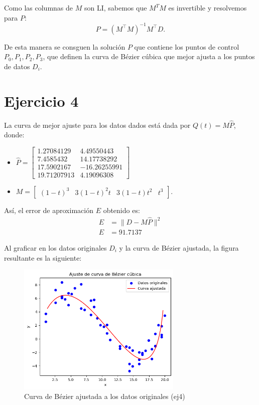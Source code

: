 \documentclass{article}
\begin{document}
Como las columnas de $M$ son LI, sabemos que $M^TM$ es invertible y resolvemos para \( P \):
\[
P = (M^\top M)^{-1} M^\top D.
\]

De esta manera se consguen la solución \( P \) que contiene los puntos de control \( P_0, P_1, P_2, P_3 \), que definen la curva de Bézier cúbica que mejor ajusta a los puntos de datos \( D_i \).

\section*{Ejercicio 4}
La curva de mejor ajuste para los datos dados está dada por $Q(t) = M \hat P$, donde:

\begin{itemize}
    \item $\hat P = 
\begin{bmatrix}
1.27084129 & 4.49550443\\
7.4585432 & 14.17738292\\
17.5902167 & -16.26255991\\
19.71207913 &  4.19096308
\end{bmatrix}$ 

    \item $M =
\begin{bmatrix}
(1 - t)^3 & 3(1 - t)^2 t & 3(1 - t) t^2 & t^3
\end{bmatrix}$.
\end{itemize}

Así, el error de aproximación $E$ obtenido es: 
$$
\begin{aligned}
E &= \|D - M \hat P \|^2 \\
E &= 91.7137
\end{aligned}
$$

Al graficar en los datos originales $D_i$ y la curva de Bézier ajustada, la figura resultante es la siguiente:

\begin{figure}[H]
    \centering
    \includegraphics[width=0.7\textwidth]{ej4.png}
    \caption{Curva de Bézier ajustada a los datos originales (ej4)}
\end{figure}
\end{document}
